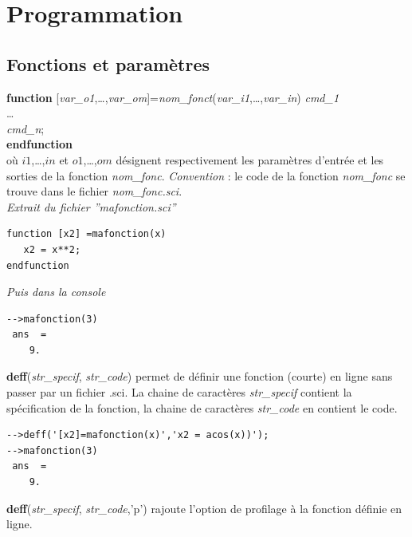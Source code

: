 \documentclass{article}
\begin{document}
\begin{multicols}{3}
\begin{description}
\end{description}


\section{Programmation}
\subsection{Fonctions et paramètres}
\label{fonctions}
\begin{description}
\item{\textbf{function} [\textit{var\_o1},\ldots,\textit{var\_om}]=\textit{nom\_fonct}(\textit{var\_i1},\ldots,\textit{var\_in})}
	 \textit{cmd\_1}\\ \ldots\\\textit{cmd\_n};\\
\hspace*{-7mm}\textbf{endfunction}\\
où $i1$,\ldots,$in$  et $o1$,\ldots,$om$ désignent respectivement les paramètres d'entrée et les sorties de la fonction \textit{nom\_fonc}. \emph{Convention} : le code de la fonction \textit{nom\_fonc} se trouve dans le fichier \textit{nom\_fonc.sci}.\\

\emph{Extrait du fichier ''mafonction.sci''}
\begin{verbatim}
function [x2] =mafonction(x)
   x2 = x**2;
endfunction
\end{verbatim}
\vspace{3mm}
\emph{Puis dans la console}
\begin{verbatim}
-->mafonction(3)
 ans  =
    9.
\end{verbatim}

\item{\label{deff}\textbf{deff}(\textit{str\_specif}, \textit{str\_code})} permet de définir une fonction (courte) en ligne sans passer par un fichier .sci. La chaine de caractères \textit{str\_specif} contient la spécification de la fonction, la chaine de caractères \textit{str\_code} en contient le code.
\begin{verbatim}
-->deff('[x2]=mafonction(x)','x2 = acos(x))');
-->mafonction(3)
 ans  =
    9.
\end{verbatim}
\item{\textbf{deff}(\textit{str\_specif}, \textit{str\_code},'p')} rajoute l'option de profilage à la fonction définie en ligne.
\end{description}


\end{multicols}
\end{document}
